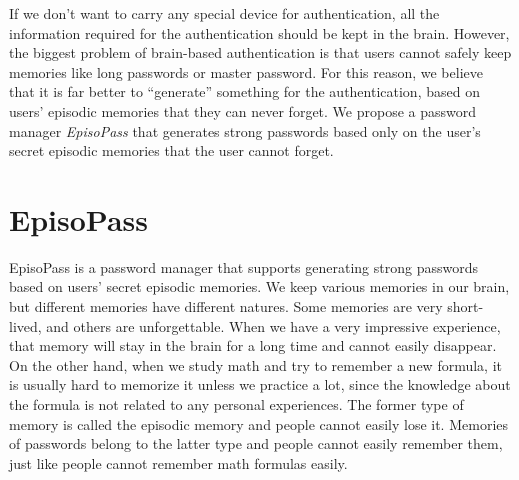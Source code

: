 \documentclass[runningheads,a4paper]{llncs}
\begin{document}
If we don't want to carry any special device for authentication,
all the information required for the authentication should be
kept in the brain.
%
However, the biggest problem of brain-based authentication is that
users cannot safely keep memories like long passwords or master password.
For this reason, we believe that
it is far better to ``generate'' something for the authentication,
based on users' episodic memories that they can never forget.
%
%
We propose a password manager \textit{EpisoPass} that generates strong passwords
based only on the user's secret episodic memories that the user cannot forget.

\section{EpisoPass}

EpisoPass is a password manager that supports generating
strong passwords based on users' secret episodic memories.
%
%
We keep various memories in our brain, but different memories have different natures.
Some memories are very short-lived, and others are unforgettable.
When we have a very impressive experience,
that memory will stay in the brain for a long time and
cannot easily disappear.
On the other hand, when we study math and try to remember a new formula,
it is usually hard to memorize it unless we practice a lot,
since the knowledge about the formula is not related to
any personal experiences.
The former type of memory is called the episodic memory and
people cannot easily lose it.
Memories of passwords belong to the latter type and
people cannot easily remember them, just like people cannot
remember math formulas easily.
\end{document}
